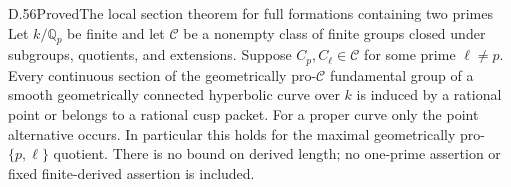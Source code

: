 \begin{statement}{D.56}{Proved}{The local section theorem for full formations containing two primes}
Let \(k/\mathbb Q_p\) be finite and let \(\mathcal C\) be a nonempty
class of finite groups closed under subgroups, quotients, and
extensions.  Suppose \(C_p,C_\ell\in\mathcal C\) for some prime
\(\ell\ne p\).  Every continuous section of the geometrically
pro-\(\mathcal C\) fundamental group of a smooth geometrically
connected hyperbolic curve over \(k\) is induced by a rational
point or belongs to a rational cusp packet.  For a proper curve
only the point alternative occurs.  In particular this holds
for the maximal geometrically pro-\(\{p,\ell\}\) quotient.
There is no bound on derived length; no one-prime assertion or
fixed finite-derived assertion is included.
\end{statement}
